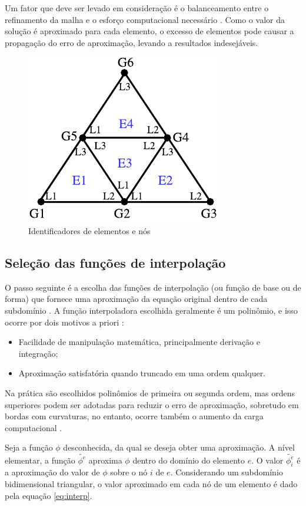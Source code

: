 \documentclass[
    12pt,               %
    openright,          %
    oneside,
    a4paper,            %
    english,            %
    french,             %
    spanish,            %
    brazil              %
    ]{abntex2}
\begin{document}
Um fator que deve ser levado em consideração é o balanceamento entre o refinamento da malha e o esforço computacional necessário \cite{desai}. Como o valor da solução é aproximado para cada elemento, o excesso de elementos pode causar a propagação do erro de aproximação, levando a resultados indesejáveis.


\begin{figure}[!htb]
	\centering
	\includegraphics[scale=1]{figuras/id.pdf}
	\caption{Identificadores de elementos e nós}
	\label{fig:numeracao}
\end{figure}

\subsection{Seleção das funções de interpolação}
\label{sec:interp}
O passo seguinte é a escolha das funções de interpolação (ou função de base ou de forma) \cite{huebner} que fornece uma aproximação da equação original dentro de cada subdomínio \cite{jin}. 
A função interpoladora escolhida geralmente é um polinômio, e isso ocorre por dois motivos a priori \cite{desai}:

\begin{itemize}  
	\item Facilidade de manipulação matemática, principalmente derivação e integração;
	\item Aproximação satisfatória quando truncado em uma ordem qualquer.
\end{itemize}

Na prática são escolhidos polinômios de primeira ou segunda ordem, mas ordens superiores podem ser adotadas para reduzir o erro de aproximação, sobretudo em bordas com curvaturas, no entanto, ocorre também o aumento da carga computacional \cite{jin}.

Seja a função $\phi$ desconhecida, da qual se deseja obter uma aproximação. A nível elementar, a função $\tilde{\phi^e}$ aproxima $\phi$ dentro do domínio do elemento $e$. O valor $\tilde{\phi^{e}_i}$  é a aproximação do valor de $\phi$ sobre o nó $i$ de $e$. Considerando um subdomínio bidimensional triangular, o valor aproximado em cada nó de um elemento é dado pela equação \ref{eq:interp}.
\end{document}
